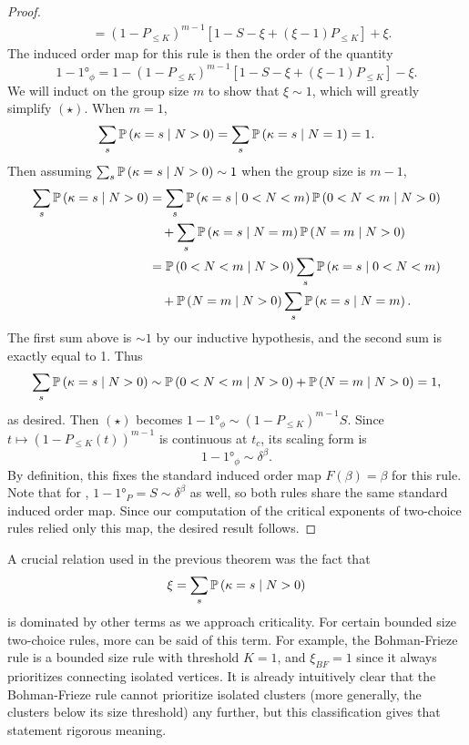 \documentclass[twoside,10pt]{article}
\newcommand{\BF}{Bohman-Frieze\xspace}
\begin{document}
\begin{proof}
\begin{align*}
				 &= (1- P_{\leq K})^{m-1} \left[ 1 - S - \xi + (\xi-1)P_{\leq K} \right] + \xi.
	\end{align*}
	The induced order map for this rule is then the order of the quantity
	\[
	1 - \ang{1}_{\phi} = 1 - (1- P_{\leq K})^{m-1} \left[ 1 - S - \xi + (\xi-1)P_{\leq K} \right] - \xi. \tag{$\star$}
	\] 
	We will induct on the group size $m$ to show that $\xi \sim 1$, which will greatly simplify $(\star)$. When $m=1$,
	\[
	\sum_{s} \P{ \kappa=s\;|\; N>0 } = \sum_{s}\P{ \kappa=s\;|\; N=1 } = 1.
	\] Then assuming $\sum_{s} \P{ \kappa=s\;|\; N>0 } \sim 1$ when the group size is $m-1$,
	\begin{align*}
		\sum_{s}\P{ \kappa=s\;|\; N>0 } &= \sum_{s}\P{ \kappa=s\;|\; 0<N<m }\P{ 0<N<m\;|\;N>0 } \\
							 &\quad + \sum_{s} \P{ \kappa=s\;|\; N=m }\P{ N=m\;|\;N>0 } \\
							 &= \P{ 0<N<m\;|\; N>0 } \sum_{s} \P{ \kappa=s\;|\; 0<N<m } \\
							 &\quad + \P{ N=m\;|\;N>0 }\sum_{s}\P{ \kappa=s\;|\; N=m }.
	\end{align*}
	The first sum above is $\sim 1$ by our inductive hypothesis, and the second sum is exactly equal to 1. Thus
	\[
		\sum_{s}\P{ \kappa=s\;|\; N>0 } \sim \P{ 0<N<m\;|\; N>0 } + \P{ N=m\;|\;N>0 } = 1,
	\]
	as desired. Then $(\star)$ becomes $1 - \ang{1}_{\phi} \sim (1 - P_{\leq K})^{m-1} S$. Since $t \mapsto (1-P_{\leq K}(t))^{m-1}$ is continuous at $t_{c}$, its scaling form is
	\[
	1 - \ang{1}_{\phi} \sim \delta^{\beta}.
	\] 
	By definition, this fixes the standard induced order map $F(\beta)=\beta$ for this rule. Note that for \ER, $1 - \ang{1}_{P} = S \sim \delta^{\beta}$ as well, so both rules share the same standard induced order map. Since our computation of the critical exponents of two-choice rules relied only this map, the desired result follows.
\end{proof}

A crucial relation used in the previous theorem was the fact that
\[
\xi = \sum_{s} \P{ \kappa=s\;|\; N>0 }
\] is dominated by other terms as we approach criticality. For certain bounded size two-choice rules, more can be said of this term. For example, the \BF rule is a bounded size rule with threshold $K=1$, and $\xi_{BF}= 1$ since it always prioritizes connecting isolated vertices. It is already intuitively clear that the \BF rule cannot prioritize isolated clusters (more generally, the clusters below its size threshold) any further, but this classification gives that statement rigorous meaning.


\newpage
\printbibliography
\end{document}
